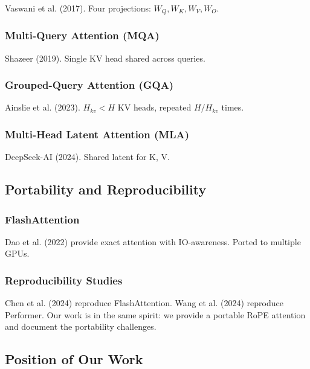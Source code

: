 Vaswani et al. (2017). Four projections: $W_Q, W_K, W_V, W_O$.

\subsubsection{Multi-Query Attention (MQA)}

Shazeer (2019). Single KV head shared across queries.

\subsubsection{Grouped-Query Attention (GQA)}

Ainslie et al. (2023). $H_{kv} < H$ KV heads, repeated $H / H_{kv}$ times.

\subsubsection{Multi-Head Latent Attention (MLA)}

DeepSeek-AI (2024). Shared latent for K, V.

\subsection{Portability and Reproducibility}

\subsubsection{FlashAttention}

Dao et al. (2022) provide exact attention with IO-awareness. Ported to 
multiple GPUs.

\subsubsection{Reproducibility Studies}

Chen et al. (2024) reproduce FlashAttention. Wang et al. (2024) reproduce 
Performer. Our work is in the same spirit: we provide a portable RoPE 
attention and document the portability challenges.

\subsection{Position of Our Work}

